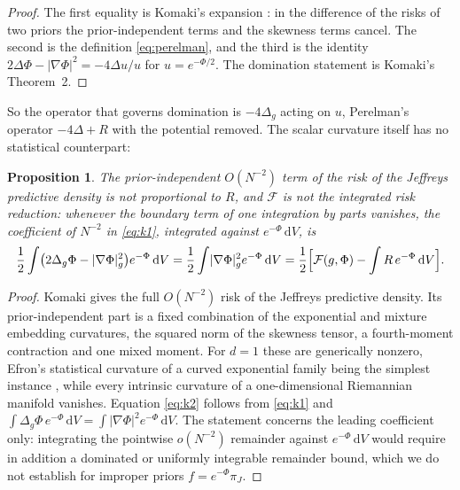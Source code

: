 \documentclass[11pt]{amsart}
\newcommand{\dd}{\,\mathrm{d}}
\newcommand{\abs}[1]{\lvert #1\rvert}
\theoremstyle{plain}
\newtheorem{proposition}[theorem]{Proposition}
\theoremstyle{definition}
\theoremstyle{remark}
\begin{document}
\begin{proof}
The first equality is Komaki's expansion \cite[eqs.~(3)--(5)]{komaki2006}: in
the difference of the risks of two priors the prior-independent terms and the
skewness terms cancel. The second is the definition \eqref{eq:perelman}, and
the third is the identity $2\Delta\Phi-\abs{\nabla\Phi}^2=-4\Delta u/u$ for
$u=e^{-\Phi/2}$. The domination statement is Komaki's Theorem~2.
\end{proof}

So the operator that governs domination is $-4\Delta_g$ acting on $u$,
Perelman's operator $-4\Delta+R$ with the potential removed. The scalar
curvature itself has no statistical counterpart:

\begin{proposition}\label{prop:noR}
The prior-independent $O(N^{-2})$ term of the risk of the Jeffreys predictive
density is not proportional to $R$, and $\mathcal F$ is not the integrated risk
reduction: whenever the boundary term of one integration by parts vanishes,
the coefficient of $N^{-2}$ in \eqref{eq:k1}, integrated against
$e^{-\Phi}\dd V$, is
\begin{equation}\label{eq:k2}
\frac12\int\bigl(2\Delta_g\Phi-\abs{\nabla\Phi}^2_g\bigr)e^{-\Phi}\dd V
=\frac12\int\abs{\nabla\Phi}^2_ge^{-\Phi}\dd V
=\frac12\Bigl[\mathcal F(g,\Phi)-\int R\,e^{-\Phi}\dd V\Bigr].
\end{equation}
\end{proposition}

\begin{proof}
Komaki \cite[Theorem~A1, eq.~(29)]{komaki2015} gives the full $O(N^{-2})$ risk
of the Jeffreys predictive density. Its prior-independent part is a fixed
combination of the exponential and mixture embedding curvatures, the squared
norm of the skewness tensor, a fourth-moment contraction and one mixed moment.
For $d=1$ these are generically nonzero, Efron's statistical curvature of a
curved exponential family being the simplest instance \cite{efron1975}, while
every intrinsic curvature of a one-dimensional Riemannian manifold vanishes.
Equation \eqref{eq:k2} follows from \eqref{eq:k1} and
$\int\Delta_g\Phi\,e^{-\Phi}\dd V=\int\abs{\nabla\Phi}^2e^{-\Phi}\dd V$. The
statement concerns the leading coefficient only: integrating the
pointwise $o(N^{-2})$ remainder against $e^{-\Phi}\dd V$ would require in
addition a dominated or uniformly integrable remainder bound, which we do not
establish for improper priors $f=e^{-\Phi}\pi_J$.
\end{proof}
\end{document}
